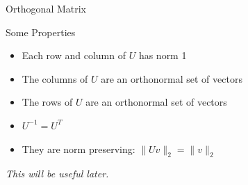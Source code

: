 \documentclass[10pt]{beamer}
\begin{document}




\begin{frame}{Orthogonal Matrix}

{
}
\vspace{3mm}

\begin{block}{Some Properties}
\begin{itemize}
    \item Each row and column of $U$ has norm 1
    \item The columns of $U$ are an orthonormal set of vectors 
    \item The rows of $U$ are an orthonormal set of vectors 
    \item $U^{-1}= U^T$
    \item They are norm preserving: $\| U v \|_2 = \|v\|_2$
\end{itemize}
\end{block}

\begin{center}
    \emph{This will be useful later.}
\end{center}
\end{frame}
\end{document}
